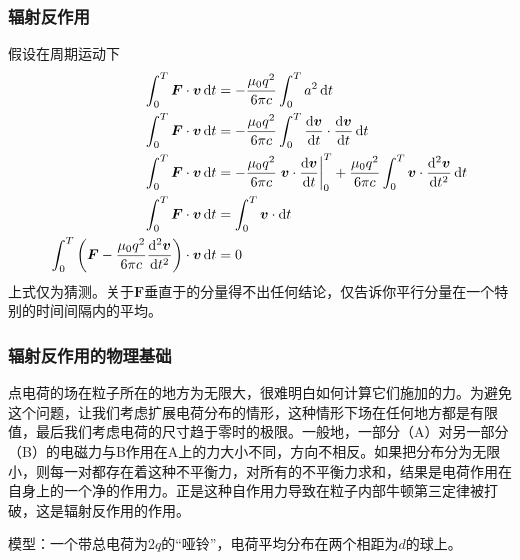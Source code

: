 \subsubsection{辐射反作用}
假设在周期运动下
\begin{align}
    \int_{0}^{T}\boldsymbol{F}\cdot\boldsymbol{v}\dif t&=-\frac{\mu_0q^2}{6\pi c}\int_{0}^{T}a^2\dif t\\
    \int_{0}^{T}\boldsymbol{F}\cdot\boldsymbol{v}\dif t&=-\frac{\mu_0q^2}{6\pi c}\int_{0}^{T}\frac{\dif\boldsymbol{v}}{\dif t}\cdot\frac{\dif\boldsymbol{v}}{\dif t}\dif t\nonumber\\
    \int_{0}^{T}\boldsymbol{F}\cdot\boldsymbol{v}\dif t&=-\frac{\mu_0q^2}{6\pi c}\left.\boldsymbol{v}\cdot\frac{\dif\boldsymbol{v}}{\dif t}\right|_{0}^{T}
    +\frac{\mu_0q^2}{6\pi c}\int_{0}^{T}\boldsymbol{v}\cdot\frac{\dif^2\boldsymbol{v}}{\dif t^2}\dif t\nonumber\\
    \int_{0}^{T}\boldsymbol{F}\cdot\boldsymbol{v}\dif t&=\int_{0}^{T}\boldsymbol{v}\cdot\dif t\nonumber\\
    \int_{0}^{T}\left(\boldsymbol{F}-\frac{\mu_0q^2}{6\pi c}\frac{\dif^2\boldsymbol{v}}{\dif t^2}\right)\cdot\boldsymbol{v}\dif t&=0
\end{align}
上式仅为猜测。关于$\boldsymbol{F}$垂直于的分量得不出任何结论，仅告诉你平行分量在一个特别的时间间隔内的平均。
\subsubsection{辐射反作用的物理基础}
点电荷的场在粒子所在的地方为无限大，很难明白如何计算它们施加的力。为避免这个问题，让我们考虑扩展电荷分布的情形，这种情形下场在任何地方都是有限值，最后我们考虑电荷的尺寸趋于零时的极限。一般地，一部分（A）对另一部分（B）的电磁力与B作用在A上的力大小不同，方向不相反。如果把分布分为无限小，则每一对都存在着这种不平衡力，对所有的不平衡力求和，结果是电荷作用在自身上的一个净的作用力。正是这种自作用力导致在粒子内部牛顿第三定律被打破，这是辐射反作用的作用。

模型：一个带总电荷为$2q$的“哑铃”，电荷平均分布在两个相距为$d$的球上。

